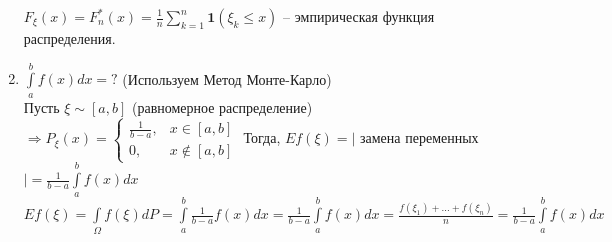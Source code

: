 \begin{corollary}
\begin{enumerate}
 $F_{\xi}(x) = F_{n}^{*}(x) = \frac{1}{n} \sum\limits_{k=1}^{n} \textbf{1}(\xi_{k} \leq x)$ -- эмпирическая функция распределения.
\item $\int\limits_{a}^{b} f(x)dx = ?$ (Используем Метод Монте-Карло)\\
Пусть $\xi \sim [a, b]$ (равномерное распределение) $\Rightarrow P_\xi (x) = \left\{\begin{matrix} \frac{1}{b-a}, & x \in [a,b]\\0, & x \notin [a,b]\end{matrix}\right.$
Тогда, $Ef(\xi) = |$ замена переменных $| = \frac{1}{b-a} \int\limits_{a}^{b} f(x)dx$\\
$Ef(\xi) = \int\limits_\Omega f(\xi)dP = \int\limits_a^b \frac{1}{b-a} f(x)dx = \frac{1}{b-a}\int\limits_a^b f(x)dx =  \frac{f(\xi_{1})+...+f(\xi_{n})}{n} = \frac{1}{b-a} \int\limits_{a}^{b} f(x)dx$
\end{enumerate}
\end{corollary}

